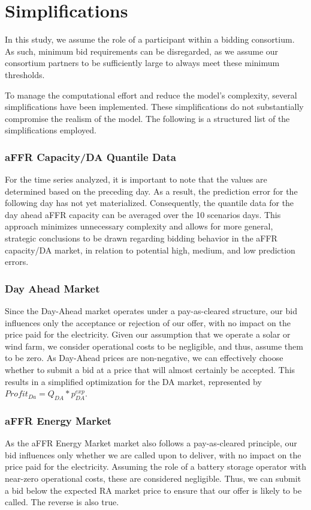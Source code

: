 \section{Simplifications}
\label{chap:Simplifications}
In this study, we assume the role of a participant within a bidding consortium.
As such, minimum bid requirements can be disregarded,
as we assume our consortium partners to be sufficiently large to always meet these minimum thresholds.

To manage the computational effort and reduce the model's complexity, several simplifications have been implemented.
These simplifications do not substantially compromise the realism of the model.
The following is a structured list of the simplifications employed.

\subsubsection{aFFR Capacity/DA Quantile Data}
For the time series analyzed, it is important to note that the values are determined based on the preceding day.
As a result, the prediction error for the following day has not yet materialized.
Consequently, the quantile data for the day ahead aFFR capacity can be averaged over the 10 scenarios days.
This approach minimizes unnecessary complexity and allows for more general,
strategic conclusions to be drawn regarding bidding behavior in the aFFR capacity/DA market,
in relation to potential high, medium, and low prediction errors.

\subsubsection{Day Ahead Market}
Since the Day-Ahead market operates under a pay-as-cleared structure, our bid influences only the acceptance or rejection of our offer,
with no impact on the price paid for the electricity.
Given our assumption that we operate a solar or wind farm, we consider operational costs to be negligible, and thus, assume them to be zero.
As Day-Ahead prices are non-negative, we can effectively choose whether to submit a bid at a price that will almost certainly be accepted.
This results in a simplified optimization for the DA market, represented by $Profit_{Da} = Q_{DA} * p^{exp}_{DA}$.

\subsubsection{aFFR Energy Market}
As the aFFR Energy Market market also follows a pay-as-cleared principle, our bid influences only whether we are called upon to deliver, with no impact on the price paid for the electricity.
Assuming the role of a battery storage operator with near-zero operational costs, these are considered negligible.
Thus, we can submit a bid below the expected RA market price to ensure that our offer is likely to be called.
The reverse is also true.

